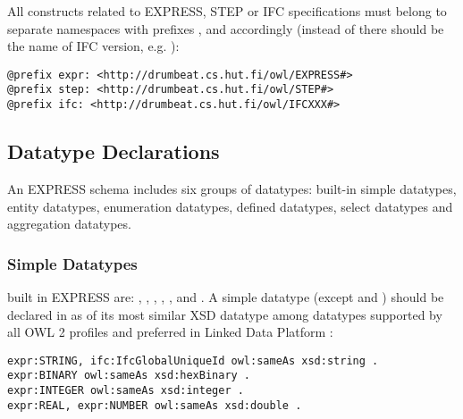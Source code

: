 All constructs related to EXPRESS, STEP or IFC specifications must belong to separate namespaces with prefixes ,  and  accordingly (instead of  there should be the name of IFC version, e.g. ):

\begin{lstlisting}
@prefix expr: <http://drumbeat.cs.hut.fi/owl/EXPRESS#>
@prefix step: <http://drumbeat.cs.hut.fi/owl/STEP#>
@prefix ifc: <http://drumbeat.cs.hut.fi/owl/IFCXXX#>
\end{lstlisting}




\subsection{Datatype Declarations}
\label{subsec:ifcOWL-types}

An EXPRESS schema includes six groups of data\-types: built-in simple data\-types, entity data\-types, enumeration data\-types, defined data\-types, select data\-types and aggregation data\-types.



\subsubsection{Simple Datatypes} built in EXPRESS are: , , , , ,  and . A simple data\-type (except  and ) should be declared in \ifcowl{} as  of its most similar XSD data\-type among data\-types supported by all OWL 2 profiles \cite{motik2013owl} and preferred in Linked Data Platform \cite{ldp-best-practices}:

\begin{lstlisting}
expr:STRING, ifc:IfcGlobalUniqueId owl:sameAs xsd:string .
expr:BINARY owl:sameAs xsd:hexBinary .
expr:INTEGER owl:sameAs xsd:integer .
expr:REAL, expr:NUMBER owl:sameAs xsd:double .
\end{lstlisting}

